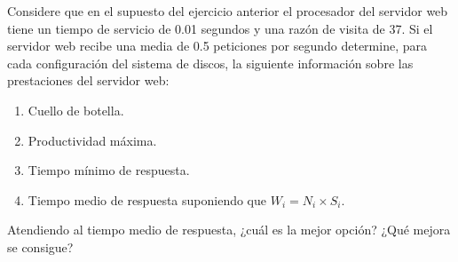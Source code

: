 \begin{ejercicio}\label{ej:5.16}
    Considere que en el supuesto del ejercicio anterior el procesador del servidor web tiene un tiempo de servicio de 0.01 segundos y una razón de visita de 37. Si el servidor web recibe una media de 0.5 peticiones por segundo determine, para cada configuración del sistema de discos, la siguiente información sobre las prestaciones del servidor web:
    \begin{enumerate}
        \item Cuello de botella.
        \item Productividad máxima.
        \item Tiempo mínimo de respuesta.
        \item Tiempo medio de respuesta suponiendo que $W_i = N_i \times S_i$.
    \end{enumerate}
    Atendiendo al tiempo medio de respuesta, ¿cuál es la mejor opción? ¿Qué mejora se consigue?
\end{ejercicio}
\begin{comment}
\solucion
    \begin{enumerate}
        \item En el primer caso el cuello de botella es el disco. La productividad máxima es $0.926$ peticiones por segundo. El tiempo mínimo de respuesta es $1.45$ s, y su valor medio es $2.8$ s.
        \item En el segundo caso los tres discos actúan como cuellos de botella. La productividad máxima tiene el mismo valor que el caso anterior. El tiempo mínimo de respuesta es $3.61$ s y su valor medio es $7.5$ s.
        \item Atendiendo al tiempo de respuesta es preferible disponer de un único disco tres veces más rápido que tres discos lentos; la mejora conseguida en este índice es $2.7$.
    \end{enumerate}
\end{comment}

